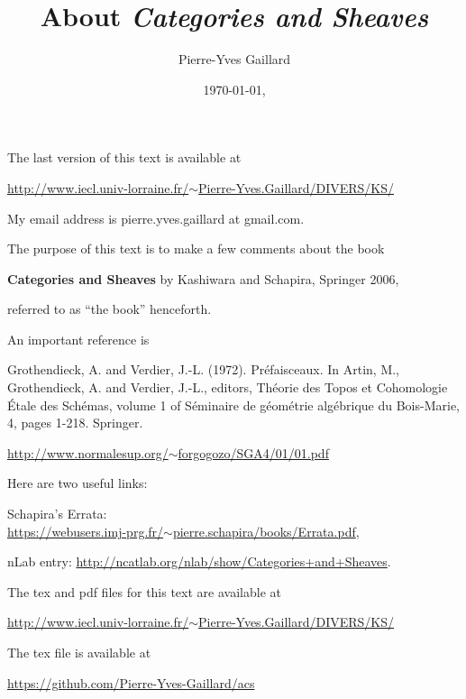 \documentclass[12pt]{article}
\title{About \em{Categories and Sheaves}}
\author{Pierre-Yves Gaillard}%
\date{\today, \currenttime}
\theoremstyle{remark}
\theoremstyle{definition}
\begin{document}
\maketitle

\nn The last version of this text is available at\medskip

\centerline{\href{http://www.iecl.univ-lorraine.fr/~Pierre-Yves.Gaillard/DIVERS/KS/}{http://www.iecl.univ-lorraine.fr/$\sim$Pierre-Yves.Gaillard/DIVERS/KS/}}

My email address is pierre.yves.gaillard at gmail.com.

\tableofcontents\newpage

\nn The purpose of this text is to make a few comments about the book 

\textbf{Categories and Sheaves} by Kashiwara and Schapira, Springer 2006, 

\nn referred to as ``the book'' henceforth. 

An important reference is

\nn[GV] Grothendieck, A. and Verdier, J.-L. (1972). Préfaisceaux. In Artin, M., Grothendieck, A. and Verdier, J.-L., editors, Théorie des Topos et Cohomologie Étale des Schémas, volume 1 of Séminaire de géométrie algébrique du Bois-Marie, 4, pages 1-218. Springer. 

\nn\href{http://www.normalesup.org/~forgogozo/SGA4/01/01.pdf}{http://www.normalesup.org/$\sim$forgogozo/SGA4/01/01.pdf}%

Here are two useful links:

\nn Schapira's Errata:\\ \href{https://webusers.imj-prg.fr/~pierre.schapira/books/Errata.pdf}{https://webusers.imj-prg.fr/$\sim$pierre.schapira/books/Errata.pdf}, 

\nn nLab entry: \href{http://ncatlab.org/nlab/show/Categories+and+Sheaves}{http://ncatlab.org/nlab/show/Categories+and+Sheaves}. 

The tex and pdf files for this text are available at
 
\nn\href{http://www.iecl.univ-lorraine.fr/~Pierre-Yves.Gaillard/DIVERS/KS/}{http://www.iecl.univ-lorraine.fr/$\sim$Pierre-Yves.Gaillard/DIVERS/KS/}

The tex file is available at

\nn\href{https://github.com/Pierre-Yves-Gaillard/acs}{https://github.com/Pierre-Yves-Gaillard/acs}
\end{document}
